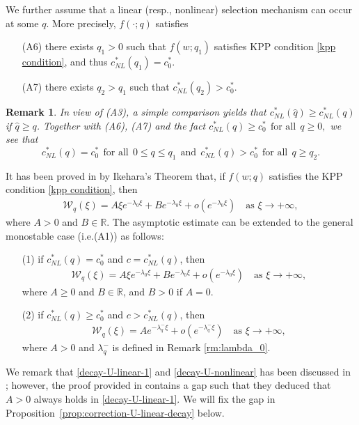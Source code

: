 \documentclass[11pt,a4paper]{article}
\newtheorem{remark}[theorem]{\textbf{Remark}}
\numberwithin{equation}{section}
\numberwithin{figure}{section}
\newcommand\bea{\begin{eqnarray}}
\newcommand\eea{\end{eqnarray}}
\newcommand\beaa{\begin{eqnarray*}}
\newcommand\eeaa{\end{eqnarray*}}
\begin{document}
We further assume that a linear (resp., nonlinear) selection mechanism can occur at some $q$.
More precisely, $f(\cdot;q)$ satisfies %
\begin{itemize}
    \item[(A6)] there exists $q_1>0$ such that $f(w;q_1)$ satisfies KPP condition \eqref{kpp condition},
   and thus $c_{NL}^*(q_1)=c^*_0$.
    \item[(A7)]  there exists  %
     $q_2>q_1$ such that $c_{NL}^*(q_2)>c^*_0$.
\end{itemize}

\begin{remark}\label{rk:a6+a7}
In view of (A3), a simple comparison yields that $c_{NL}^*(\hat{q})\geq c_{NL}^*(q)$ if $\hat{q}\geq q$.
Together with (A6), (A7) and the fact 
$c_{NL}^*(q)\geq c^*_0\ \ \text{for all}\ \ q\geq0,$
we see that
$$c_{NL}^*(q)=c^*_0\ \ \text{for all}\ \ 0\leq q\leq q_1\ \ \text{and}\ \ c_{NL}^*(q)>c^*_0\ \ \text{for all}\ \ q\geq q_2.$$
\end{remark}


It has been proved in \cite{Carr Chmaj} by Ikehara's Theorem that, if $f(w;q)$ satisfies the KPP condition \eqref{kpp condition}, then
\beaa
\mathcal{W}_q(\xi)=A\xi e^{-\lambda_0\xi}+Be^{-\lambda_0\xi}+o(e^{-\lambda_0\xi})\quad \mbox{as $\xi\to+\infty$},
\eeaa
where $A>0$ and $B\in \mathbb{R}$.
The asymptotic estimate %
can be extended to the general monostable case (i.e.(A1)) %
as follows:
\begin{itemize}
\item[(1)] if $c_{NL}^*(q)=c^*_0$ and $c=c_{NL}^*(q)$, then
\bea\label{decay-U-linear-1}
\mathcal{W}_q(\xi)=A\xi e^{-\lambda_0\xi}+Be^{-\lambda_0\xi}+o(e^{-\lambda_0\xi})\quad \mbox{as $\xi\to+\infty$},
\eea
where $A\geq0$ and $B\in \mathbb{R}$,
and $B>0$ if $A=0$.
\item[(2)] if $c_{NL}^*(q)\ge c^*_0$ and $c>c_{NL}^*(q)$, then
\bea\label{decay-U-nonlinear}
\mathcal{W}_q(\xi)=Ae^{-\lambda^-_q\xi}+o(e^{-\lambda_q^-\xi})\quad \mbox{as $\xi\to+\infty$},
\eea
where $A>0$ and $\lambda^-_q$ is defined in Remark \ref{rm:lambda_0}.
\end{itemize}
We remark that \eqref{decay-U-linear-1} and \eqref{decay-U-nonlinear} has been discussed in
\cite{Coville}; however, the proof provided in \cite[Theorem 1.6]{Coville} contains a gap such that they deduced that $A>0$ always holds in \eqref{decay-U-linear-1}.
We will fix the gap in Proposition~\ref{prop:correction-U-linear-decay} below.
\end{document}
